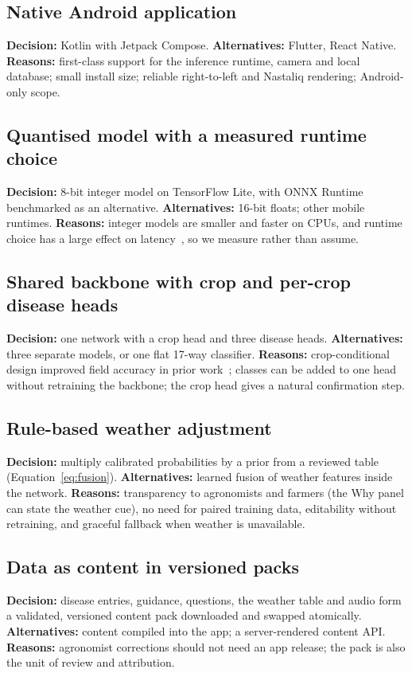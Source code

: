 \subsection{Native Android application}
\textbf{Decision:} Kotlin with Jetpack Compose. \textbf{Alternatives:} Flutter, React Native. \textbf{Reasons:} first-class support for the inference runtime, camera and local database; small install size; reliable right-to-left and Nastaliq rendering; Android-only scope.

\subsection{Quantised model with a measured runtime choice}
\textbf{Decision:} 8-bit integer model on TensorFlow Lite, with ONNX Runtime benchmarked as an alternative. \textbf{Alternatives:} 16-bit floats; other mobile runtimes. \textbf{Reasons:} integer models are smaller and faster on CPUs, and runtime choice has a large effect on latency~\cite{zhangq2022mobilebench}, so we measure rather than assume.

\subsection{Shared backbone with crop and per-crop disease heads}
\textbf{Decision:} one network with a crop head and three disease heads. \textbf{Alternatives:} three separate models, or one flat 17-way classifier. \textbf{Reasons:} crop-conditional design improved field accuracy in prior work~\cite{picon2019cropcond}; classes can be added to one head without retraining the backbone; the crop head gives a natural confirmation step.

\subsection{Rule-based weather adjustment}
\textbf{Decision:} multiply calibrated probabilities by a prior from a reviewed table (Equation~\ref{eq:fusion}). \textbf{Alternatives:} learned fusion of weather features inside the network. \textbf{Reasons:} transparency to agronomists and farmers (the Why panel can state the weather cue), no need for paired training data, editability without retraining, and graceful fallback when weather is unavailable.

\subsection{Data as content in versioned packs}
\textbf{Decision:} disease entries, guidance, questions, the weather table and audio form a validated, versioned content pack downloaded and swapped atomically. \textbf{Alternatives:} content compiled into the app; a server-rendered content API. \textbf{Reasons:} agronomist corrections should not need an app release; the pack is also the unit of review and attribution.

